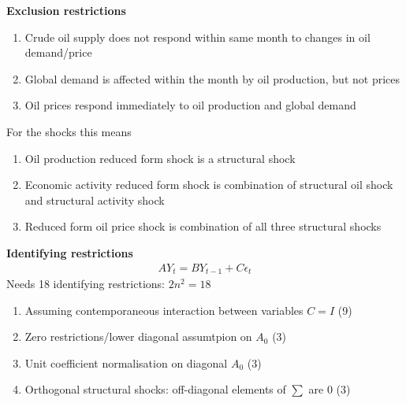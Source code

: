 \documentclass{beamer}
\begin{document}
\begin{frame}
  \textbf{Exclusion restrictions}
  \begin{enumerate}
    \item Crude oil supply does not respond within same month to changes in oil demand/price
    \item Global demand is affected within the month by oil production, but not prices
    \item Oil prices respond immediately to oil production and global demand
  \end{enumerate}
  \medskip
  For the shocks this means
  \begin{enumerate}
  \item Oil production reduced form shock is a structural shock
  \item Economic activity reduced form shock is combination of structural oil shock and structural activity shock
  \item Reduced form oil price shock is combination of all three structural shocks
\end{enumerate}
\end{frame}

\begin{frame}
  \textbf{Identifying restrictions}
\begin{align*}
  AY_t=BY_{t-1} + C\epsilon_t
\end{align*}
 \medskip
 Needs 18 identifying restrictions: $2n^2=18$
 \begin{enumerate}
   \item Assuming contemporaneous interaction between variables $C=I$ (9)
   \item Zero restrictions/lower diagonal assumtpion on $A_0$ (3)
   \item Unit coefficient normalisation on diagonal $A_0$ (3)
   \item Orthogonal structural shocks: off-diagonal elements of $\sum$ are 0 (3)
 \end{enumerate}
\end{frame}
\end{document}
